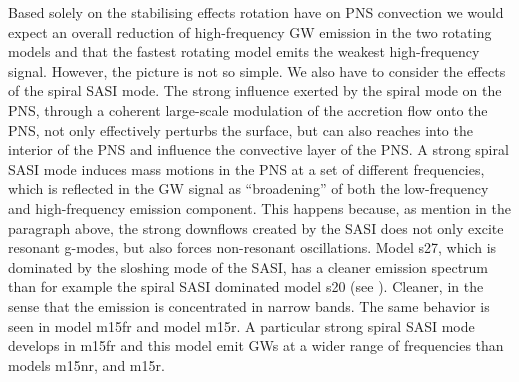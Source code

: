 Based solely on the stabilising effects rotation have on PNS convection we would expect an overall 
reduction of high-frequency GW emission in the two rotating models and that the fastest rotating model
emits the weakest high-frequency signal. However, the picture is not
so simple. 
We also have to consider the effects of the spiral SASI mode.
The strong influence exerted by the spiral mode on the PNS, through a coherent large-scale
modulation of the accretion flow onto the PNS, not only effectively perturbs the surface, 
but can also reaches into the interior of the PNS and influence the convective layer of the PNS.
A strong spiral SASI mode induces mass motions in the PNS at a set of different frequencies, which is 
reflected in the GW signal as ``broadening'' of both the low-frequency and high-frequency
emission component. This happens because, as mention in the paragraph above, the strong downflows 
created by the SASI does not only excite resonant g-modes, but also forces non-resonant oscillations. 
Model s27, which is dominated by the sloshing mode of the SASI,
has a cleaner emission spectrum than for example the spiral SASI dominated model s20 (see ). Cleaner, in the sense
that the emission is concentrated in narrow bands. The same behavior is seen in model m15fr and
model m15r. A particular strong spiral SASI mode develops in m15fr and this model emit GWs at a
wider range of frequencies than models m15nr, and m15r. 

